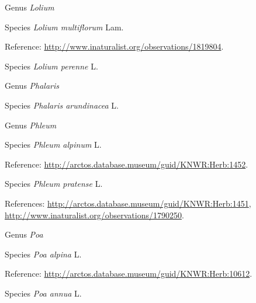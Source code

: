 \documentclass[9pt, article]{memoir}
\begin{document}
\begin{multicols}{2}
\vspace{6pt}\noindent\hspace{30pt}Genus \textit{Lolium}


\vspace{6pt}\noindent\hspace{36pt}Species \textit{Lolium multiflorum} Lam.


\vspace{6pt}Reference: 
\url{http://www.inaturalist.org/observations/1819804}.

\vspace{6pt}\noindent\hspace{36pt}Species \textit{Lolium perenne} L.


\vspace{6pt}\noindent\hspace{30pt}Genus \textit{Phalaris}


\vspace{6pt}\noindent\hspace{36pt}Species \textit{Phalaris arundinacea} L.


\vspace{6pt}\noindent\hspace{30pt}Genus \textit{Phleum}


\vspace{6pt}\noindent\hspace{36pt}Species \textit{Phleum alpinum} L.


\vspace{6pt}Reference: 
\url{http://arctos.database.museum/guid/KNWR:Herb:1452}.

\vspace{6pt}\noindent\hspace{36pt}Species \textit{Phleum pratense} L.


\vspace{6pt}References: 
\url{http://arctos.database.museum/guid/KNWR:Herb:1451}, 
\url{http://www.inaturalist.org/observations/1790250}.

\vspace{6pt}\noindent\hspace{30pt}Genus \textit{Poa}


\vspace{6pt}\noindent\hspace{36pt}Species \textit{Poa alpina} L.


\vspace{6pt}Reference: 
\url{http://arctos.database.museum/guid/KNWR:Herb:10612}.

\vspace{6pt}\noindent\hspace{36pt}Species \textit{Poa annua} L.



\end{multicols}
\end{document}
